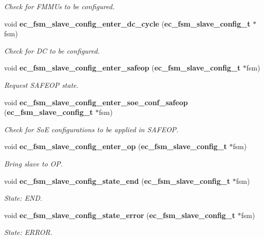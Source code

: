 \begin{DoxyCompactItemize}
\begin{DoxyCompactList}\small\item\em Check for F\-M\-M\-Us to be configured. \end{DoxyCompactList}\item 
void {\bf ec\-\_\-fsm\-\_\-slave\-\_\-config\-\_\-enter\-\_\-dc\-\_\-cycle} ({\bf ec\-\_\-fsm\-\_\-slave\-\_\-config\-\_\-t} $\ast$fsm)
\begin{DoxyCompactList}\small\item\em Check for D\-C to be configured. \end{DoxyCompactList}\item 
void {\bf ec\-\_\-fsm\-\_\-slave\-\_\-config\-\_\-enter\-\_\-safeop} ({\bf ec\-\_\-fsm\-\_\-slave\-\_\-config\-\_\-t} $\ast$fsm)
\begin{DoxyCompactList}\small\item\em Request S\-A\-F\-E\-O\-P state. \end{DoxyCompactList}\item 
void {\bf ec\-\_\-fsm\-\_\-slave\-\_\-config\-\_\-enter\-\_\-soe\-\_\-conf\-\_\-safeop} ({\bf ec\-\_\-fsm\-\_\-slave\-\_\-config\-\_\-t} $\ast$fsm)
\begin{DoxyCompactList}\small\item\em Check for So\-E configurations to be applied in S\-A\-F\-E\-O\-P. \end{DoxyCompactList}\item 
void {\bf ec\-\_\-fsm\-\_\-slave\-\_\-config\-\_\-enter\-\_\-op} ({\bf ec\-\_\-fsm\-\_\-slave\-\_\-config\-\_\-t} $\ast$fsm)
\begin{DoxyCompactList}\small\item\em Bring slave to O\-P. \end{DoxyCompactList}\item 
void {\bf ec\-\_\-fsm\-\_\-slave\-\_\-config\-\_\-state\-\_\-end} ({\bf ec\-\_\-fsm\-\_\-slave\-\_\-config\-\_\-t} $\ast$fsm)
\begin{DoxyCompactList}\small\item\em State\-: E\-N\-D. \end{DoxyCompactList}\item 
void {\bf ec\-\_\-fsm\-\_\-slave\-\_\-config\-\_\-state\-\_\-error} ({\bf ec\-\_\-fsm\-\_\-slave\-\_\-config\-\_\-t} $\ast$fsm)
\begin{DoxyCompactList}\small\item\em State\-: E\-R\-R\-O\-R. \end{DoxyCompactList}\item 

\end{DoxyCompactItemize}
